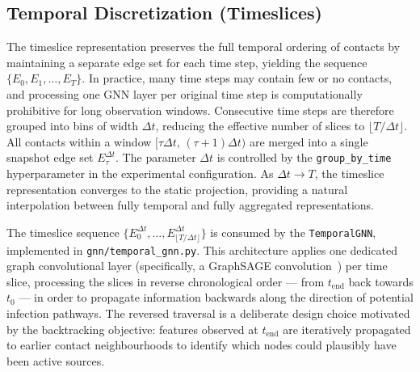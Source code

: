 \subsection{Temporal Discretization (Timeslices)}
\label{ssst:temporaldiscret}
The timeslice representation preserves the full temporal ordering of contacts by maintaining a separate edge set for each time step, yielding the sequence $\{E_0, E_1, \ldots, E_T\}$. In practice, many time steps may contain few or no contacts, and processing one GNN layer per original time step is computationally prohibitive for long observation windows. Consecutive time steps are therefore grouped into bins of width $\Delta t$, reducing the effective number of slices to $\lfloor T / \Delta t \rfloor$. All contacts within a window $[\tau \Delta t,\, (\tau+1)\Delta t)$ are merged into a single snapshot edge set $E_\tau^{\Delta t}$. The parameter $\Delta t$ is controlled by the \texttt{group\_by\_time} hyperparameter in the experimental configuration. As $\Delta t \to T$, the timeslice representation converges to the static projection, providing a natural interpolation between fully temporal and fully aggregated representations.

The timeslice sequence $\{E_0^{\Delta t}, \ldots, E_{\lfloor T/\Delta t\rfloor}^{\Delta t}\}$ is consumed by the \texttt{TemporalGNN}, implemented in \texttt{gnn/temporal\_gnn.py}. This architecture applies one dedicated graph convolutional layer (specifically, a GraphSAGE convolution~\cite{Sterchi2025}) per time slice, processing the slices in reverse chronological order — from $t_{\mathrm{end}}$ back towards $t_0$ — in order to propagate information backwards along the direction of potential infection pathways. The reversed traversal is a deliberate design choice motivated by the backtracking objective: features observed at $t_{\mathrm{end}}$ are iteratively propagated to earlier contact neighbourhoods to identify which nodes could plausibly have been active sources.

